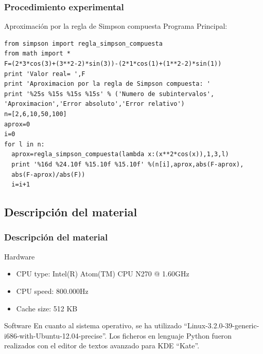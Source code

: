 \documentclass{beamer}
\begin{document}
\begin{frame}[fragile]

  \frametitle{Procedimiento experimental}
  
  \begin{block}{Aproximación por la regla de Simpson compuesta}
    Programa Principal:
    \begin{center}
      \begin{footnotesize}
        \begin{verbatim}
from simpson import regla_simpson_compuesta
from math import *
F=(2*3*cos(3)+(3**2-2)*sin(3))-(2*1*cos(1)+(1**2-2)*sin(1))
print 'Valor real= ',F
print 'Aproximacion por la regla de Simpson compuesta: '
print '%25s %15s %15s %15s' % ('Numero de subintervalos',
'Aproximacion','Error absoluto','Error relativo')
n=[2,6,10,50,100]
aprox=0
i=0
for l in n:
  aprox=regla_simpson_compuesta(lambda x:(x**2*cos(x)),1,3,l)
  print '%16d %24.10f %15.10f %15.10f' %(n[i],aprox,abs(F-aprox),
  abs(F-aprox)/abs(F))
  i=i+1
        \end{verbatim}
      \end{footnotesize}
    \end{center}
  \end{block}
  
\end{frame}
\subsection{Descripción del material}

\begin{frame}

  \frametitle{Descripción del material}
  
  \begin{block}{Hardware}
    \begin{itemize}
      \item CPU type: Intel(R) Atom(TM) CPU N270   @ 1.60GHz
      \item CPU speed: 800.000Hz
      \item Cache size: 512 KB
    \end{itemize}
  \end{block}

  \begin{block}{Software}
    En cuanto al sistema operativo, se ha utilizado ``Linux-3.2.0-39-generic-i686-with-Ubuntu-12.04-precise''.
    Los ficheros en lenguaje Python fueron realizados con el editor de textos avanzado para KDE ``Kate''.
  \end{block}

\end{frame}
\end{document}
